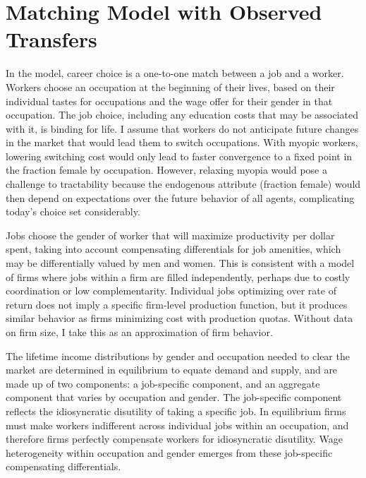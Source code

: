 \documentclass[11pt]{article}
\begin{document}




\section{Matching Model with Observed Transfers} \label{model}

In the model, career choice is a one-to-one match between a job and a worker. Workers choose an occupation at the beginning of their lives, based on their individual tastes for occupations and the wage offer for their gender in that occupation. The job choice, including any education costs that may be associated with it, is binding for life. I assume that workers do not anticipate future changes in the market that would lead them to switch occupations. With myopic workers, lowering switching cost would only lead to faster convergence to a fixed point in the fraction female by occupation. However, relaxing myopia would pose a challenge to tractability because the endogenous attribute (fraction female) would then depend on expectations over the future behavior of all agents, complicating today's choice set considerably.

Jobs choose the gender of worker that will maximize productivity per dollar spent, taking into account compensating differentials for job amenities, which may be differentially valued by men and women. This is consistent with a model of firms where jobs within a firm are filled independently, perhaps due to costly coordination or low complementarity. Individual jobs optimizing over rate of return does not imply a specific firm-level production function, but it produces similar behavior as firms minimizing cost with production quotas. Without data on firm size, I take this as an approximation of firm behavior.

The lifetime income distributions by gender and occupation needed to clear the market are determined in equilibrium to equate demand and supply, and are made up of two components: a job-specific component, and an aggregate component that varies by occupation and gender. The job-specific component reflects the idiosyncratic disutility of taking a specific job. In equilibrium firms must make workers indifferent across individual jobs within an occupation, and therefore firms perfectly compensate workers for idiosyncratic disutility. Wage heterogeneity within occupation and gender emerges from these job-specific compensating differentials. 
\end{document}
